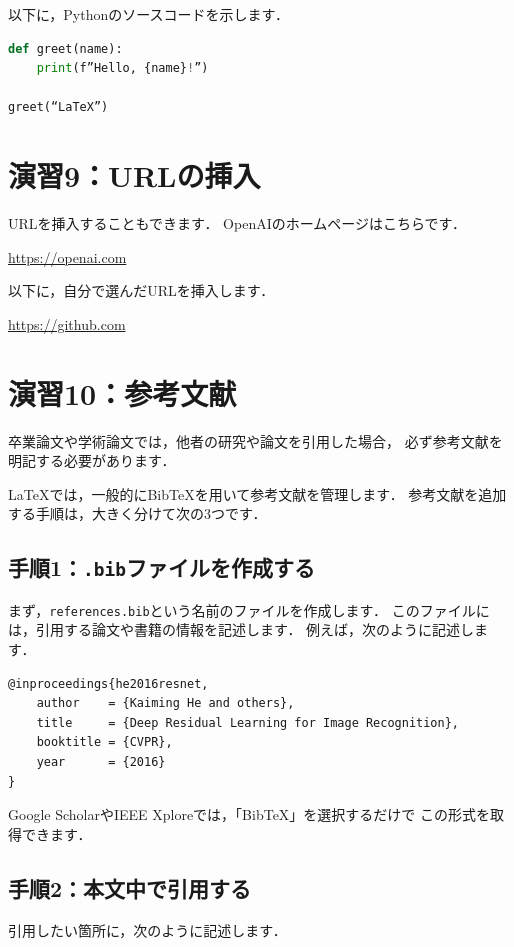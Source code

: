 \documentclass[a4paper,twocolumn]{jsarticle}
\begin{document}
以下に，Pythonのソースコードを示します．

\begin{lstlisting}[language=Python]
def greet(name):
    print(f”Hello, {name}!”)

greet(“LaTeX”)
\end{lstlisting}

\section*{演習9：URLの挿入}

URLを挿入することもできます．
OpenAIのホームページはこちらです．

\url{https://openai.com}

以下に，自分で選んだURLを挿入します．

\url{https://github.com}

\section*{演習10：参考文献}

卒業論文や学術論文では，他者の研究や論文を引用した場合，
必ず参考文献を明記する必要があります．

LaTeXでは，一般的にBibTeXを用いて参考文献を管理します．
参考文献を追加する手順は，大きく分けて次の3つです．

\subsection*{手順1：\texttt{.bib}ファイルを作成する}

まず，\texttt{references.bib}という名前のファイルを作成します．
このファイルには，引用する論文や書籍の情報を記述します．
例えば，次のように記述します．

\begin{lstlisting}[language={}]
@inproceedings{he2016resnet,
    author    = {Kaiming He and others},
    title     = {Deep Residual Learning for Image Recognition},
    booktitle = {CVPR},
    year      = {2016}
}
\end{lstlisting}

Google ScholarやIEEE Xploreでは，「BibTeX」を選択するだけで
この形式を取得できます．

\subsection*{手順2：本文中で引用する}

引用したい箇所に，次のように記述します．
\end{document}

